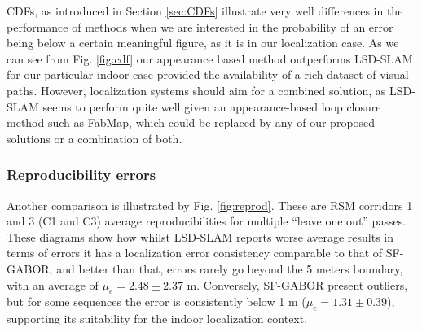 CDFs, as introduced in Section \ref{sec:CDFs} illustrate very well differences in the performance of methods when we are interested in the probability of an error being below a certain  meaningful figure, as it is in our localization case. As we can see from Fig. \ref{fig:cdf} our appearance based method outperforms LSD-SLAM for our particular indoor case provided the availability of a rich dataset of visual paths. However, localization systems should aim for a combined solution, as LSD-SLAM seems to perform quite well given an appearance-based loop closure method \citep{engel14eccv} such as FabMap, which could be replaced by any of our proposed solutions \citep{Rivera-Rubio2015PRL} or a combination of both.

\subsubsection{Reproducibility errors}

Another comparison is illustrated by Fig. \ref{fig:reprod}. These are RSM corridors 1 and 3 (C1 and C3) average reproducibilities for multiple ``leave one out'' passes. These diagrams show how whilst LSD-SLAM reports worse average results in terms of errors it has a localization error consistency comparable to that of SF-GABOR, and better than that, errors rarely go beyond the 5 meters boundary, with an average of $\mu_e = 2.48 \pm 2.37$ m. Conversely, SF-GABOR present outliers, but for some sequences the error is consistently below 1 m ($\mu_e = 1.31 \pm 0.39$), supporting its suitability for the indoor localization context.


